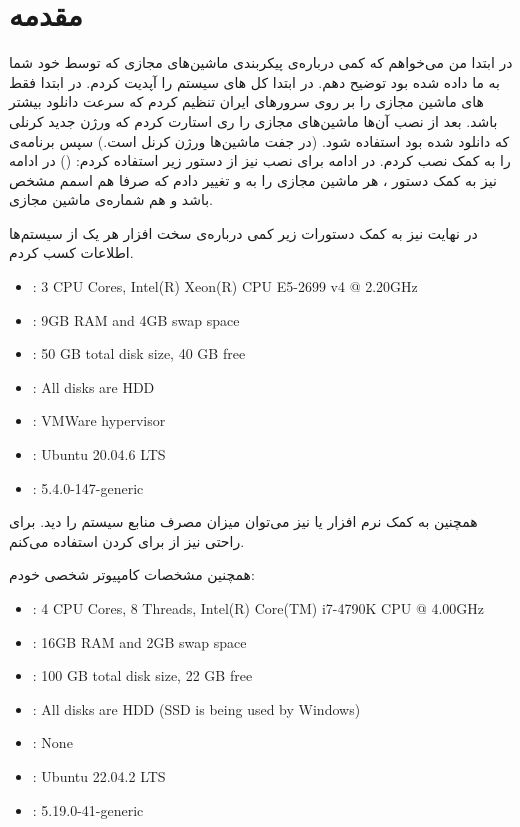 \section*{مقدمه}
در ابتدا من می‌خواهم که کمی درباره‌ی پیکربندی ماشین‌های مجازی که توسط خود شما به ما داده شده بود توضیح دهم.
در ابتدا کل
های
سیستم را آپدیت کردم. در ابتدا فقط
های
ماشین مجازی را بر روی سرور‌های ایران تنظیم کردم که سرعت دانلود بیشتر باشد. بعد از نصب آن‌ها ماشین‌های مجازی را
ری استارت کردم که ورژن جدید کرنلی که دانلود شده بود استفاده شود.
(در جفت ماشین‌ها ورژن کرنل  است.)
سپس برنامه‌ی
را به کمک
نصب کردم. در ادامه برای نصب
نیز از دستور زیر استفاده کردم:
()
در ادامه نیز به کمک دستور
،
هر ماشین مجازی را به
 و 
تغییر دادم که صرفا هم اسمم مشخص باشد و هم شماره‌ی ماشین مجازی.

در نهایت نیز به کمک دستورات زیر کمی درباره‌ی سخت افزار هر یک از سیستم‌ها اطلاعات کسب کردم.
\begin{latin}
\begin{itemize}
    \item {}: 3 CPU Cores, Intel(R) Xeon(R) CPU E5-2699 v4 @ 2.20GHz
    \item {}: 9GB RAM and 4GB swap space
    \item {}: 50 GB total disk size, 40 GB free
    \item {}: All disks are HDD
    \item {}: VMWare hypervisor
    \item {}: Ubuntu 20.04.6 LTS
    \item {}: 5.4.0-147-generic
\end{itemize}
\end{latin}
همچنین به کمک نرم افزار
 یا 
نیز می‌توان میزان مصرف منابع سیستم را دید. برای راحتی نیز از
برای
کردن استفاده می‌کنم.

همچنین مشخصات کامپیوتر شخصی خودم:
\begin{latin}
\begin{itemize}
    \item {}: 4 CPU Cores, 8 Threads, Intel(R) Core(TM) i7-4790K CPU @ 4.00GHz
    \item {}: 16GB RAM and 2GB swap space
    \item {}: 100 GB total disk size, 22 GB free
    \item {}: All disks are HDD (SSD is being used by Windows)
    \item {}: None
    \item {}: Ubuntu 22.04.2 LTS
    \item {}: 5.19.0-41-generic
\end{itemize}
\end{latin}